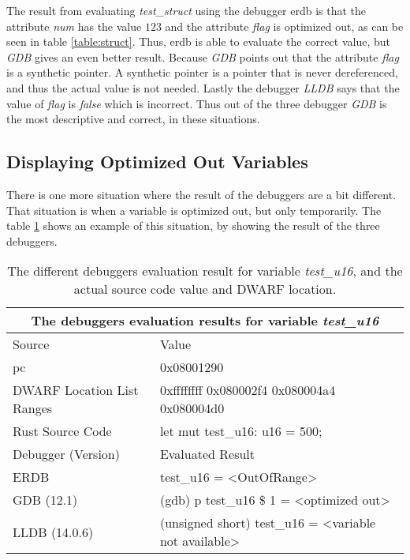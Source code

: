 The result from evaluating \emph{test\_struct} using the debugger \gls{erdb} is that the attribute \emph{num} has the value $123$ and the attribute \emph{flag} is optimized out, as can be seen in table \ref{table:struct}.
Thus, \gls{erdb} is able to evaluate the correct value, but \emph{GDB} gives an even better result.
Because \emph{GDB} points out that the attribute \emph{flag} is a synthetic pointer.
A synthetic pointer is a pointer that is never dereferenced, and thus the actual value is not needed. 
Lastly the debugger \emph{LLDB} says that the value of \emph{flag} is \emph{false} which is incorrect.
Thus out of the three debugger \emph{GDB} is the most descriptive and correct, in these situations.



\subsection{Displaying Optimized Out Variables}
There is one more situation where the result of the debuggers are a bit different.
That situation is when a variable is optimized out, but only temporarily.
The table \ref{table:u16} shows an example of this situation, by showing the result of the three debuggers.


\begin{table}[h]
	\centering
	\small
	\begin{tabular}{ |p{2cm}|p{8cm}|  }
		\hline
		\multicolumn{2}{|c|}{\textbf{The debuggers evaluation results for variable \emph{test\_u16}}} \\ 
		\hline
		\hline
		Source & Value \\
		\hline
		\acrfull{pc} & 0x08001290 \\

		DWARF Location List Ranges & 0xffffffff 	0x080002f4\newline
    					     0x080004a4 	0x080004d0\\

		Rust Source Code & let mut test\_u16: u16 = 500; \\
		\hline
		\hline
		Debugger (Version) & Evaluated Result \\
		\hline
		ERDB & test\_u16 = \textless OutOfRange\textgreater \\

		GDB (12.1)  & (gdb) p test\_u16\newline
		\$ 1 = \textless optimized out\textgreater \\

		LLDB (14.0.6) & (unsigned short) test\_u16 = \textless variable not available\textgreater \\
		\hline
	\end{tabular}
	\caption{The different debuggers evaluation result for variable \emph{test\_u16}, and the actual source code value and DWARF location.}
	\label{table:u16}
\end{table}


